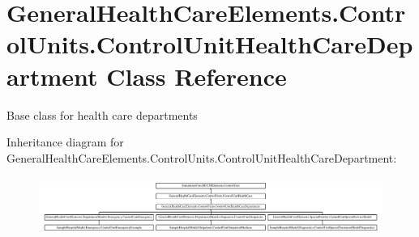 \hypertarget{class_general_health_care_elements_1_1_control_units_1_1_control_unit_health_care_department}{}\section{General\+Health\+Care\+Elements.\+Control\+Units.\+Control\+Unit\+Health\+Care\+Department Class Reference}
\label{class_general_health_care_elements_1_1_control_units_1_1_control_unit_health_care_department}


Base class for health care departments  


Inheritance diagram for General\+Health\+Care\+Elements.\+Control\+Units.\+Control\+Unit\+Health\+Care\+Department\+:\begin{figure}[H]
\begin{center}
\leavevmode
\includegraphics[height=1.920439cm]{class_general_health_care_elements_1_1_control_units_1_1_control_unit_health_care_department}
\end{center}
\end{figure}
